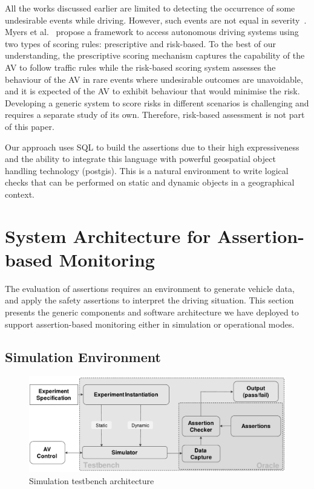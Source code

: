 All the works discussed earlier are limited to detecting the occurrence of some undesirable events while driving. However, such events are not equal in severity~\cite{sinha}. Myers et al.~\cite{myers} propose a framework to access autonomous driving systems using two types of scoring rules: prescriptive and risk-based. To the best of our understanding, the prescriptive scoring mechanism captures the capability of the AV to follow traffic rules while the risk-based scoring system assesses the behaviour of the AV in rare events where undesirable outcomes are unavoidable, and it is expected of the AV to exhibit behaviour that would minimise the risk. Developing a generic system to score risks in different scenarios is challenging and requires a separate study of its own. Therefore, risk-based assessment is not part of this paper.

Our approach uses SQL to build the assertions due to their high expressiveness~\cite{sqllibkin} and the ability to integrate this language with powerful geospatial object handling technology (postgis). This is a natural environment to write logical checks that can be performed on static and dynamic objects in a geographical context. 
%



\section{System Architecture for Assertion-based Monitoring} \label{generic_architecture}

The evaluation of assertions requires an environment to generate vehicle data, and apply the safety assertions to interpret the driving situation. This section presents the generic components and software architecture we have deployed to support assertion-based monitoring either in simulation or operational modes.

\subsection{Simulation Environment} \label{generic_sim_system}

\begin{figure}[!ht]
    \centering
    \includegraphics[width=0.98\linewidth]{../other/figures/SimulatorAssertionsTestBenchArchitectureV7.pdf}
    \caption{Simulation testbench architecture}
    \label{fig:SimulatorArchitecture}
\end{figure}

